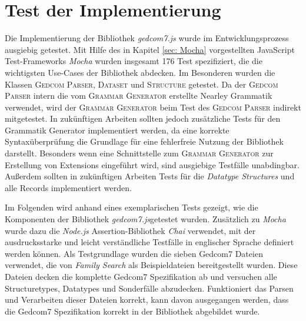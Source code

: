 \section{Test der Implementierung}
Die Implementierung der Bibliothek \textit{gedcom7.js} wurde im Entwicklungsprozess ausgiebig getestet. Mit Hilfe des in Kapitel \ref{sec: Mocha} vorgestellten JavaScript Test-Frameworks \textit{Mocha} wurden insgesamt 176 Test spezifiziert, die die wichtigsten Use-Cases der Bibliothek abdecken. Im Besonderen wurden die Klassen \textsc{Gedcom Parser}, \textsc{Dataset} und \textsc{Structure} getestet. Da der \textsc{Gedcom Parser} intern die vom \textsc{Grammar Generator} erstellte Nearley Grammatik verwendet, wird der \textsc{Grammar Generator} beim Test des \textsc{Gedcom Parser} indirekt mitgetestet. In zukünftigen Arbeiten sollten jedoch zusätzliche Tests für den Grammatik Generator implementiert werden, da eine korrekte Syntaxüberprüfung die Grundlage für eine fehlerfreie Nutzung der Bibliothek darstellt. Besonders wenn eine Schnittstelle zum \textsc{Grammar Generator} zur Erstellung von Extensions eingeführt wird, sind ausgiebige Testfälle unabdingbar. Außerdem sollten in zukünftigen Arbeiten Tests für die \textit{Datatype Structures} und alle Records implementiert werden. 


Im Folgenden wird anhand eines exemplarischen Tests gezeigt, wie die Komponenten der Bibliothek \textit{gedcom7.js}getestet wurden. Zusätzlich zu \textit{Mocha} wurde dazu die \textit{Node.js} Assertion-Bibliothek \textit{Chai} verwendet, mit der ausdrucksstarke und leicht verständliche Testfälle in englischer Sprache definiert werden können. Als Testgrundlage wurden die sieben Gedcom7 Dateien verwendet, die von \textit{Family Search} als Beispieldateien bereitgestellt wurden. Diese Dateien decken die komplette Gedcom7 Spezifikation ab und versuchen alle Structuretypes, Datatypes und Sonderfälle abzudecken. Funktioniert das Parsen und Verarbeiten dieser Dateien korrekt, kann davon ausgegangen werden, dass die Gedcom7 Spezifikation korrekt in der Bibliothek abgebildet wurde.


